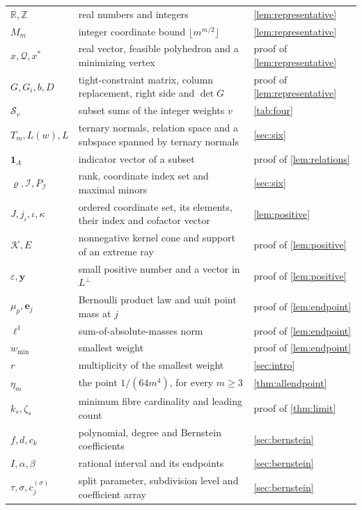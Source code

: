 \documentclass[11pt,a4paper]{article}
\numberwithin{equation}{section}
\theoremstyle{remark}
\newcommand{\eps}{\varepsilon}
\newcommand{\R}{\mathbb R}
\newcommand{\Z}{\mathbb Z}
\begin{document}
\begin{longtable}{p{}p{}p{}}
$\R,\Z$ & real numbers and integers & \cref{lem:representative}\\
$M_m$ & integer coordinate bound $\lfloor m^{m/2}\rfloor$ & \cref{lem:representative}\\
$x,\mathcal Q,x^*$ & real vector, feasible polyhedron and a minimizing vertex & proof of \cref{lem:representative}\\
$G,G_i,b,D$ & tight-constraint matrix, column replacement, right side and $\det G$ & proof of \cref{lem:representative}\\
$\mathcal S_v$ & subset sums of the integer weights $v$ & \cref{tab:four}\\
$T_m,L(w),L$ & ternary normals, relation space and a subspace spanned by ternary normals & \cref{sec:six}\\
$\mathbf 1_A$ & indicator vector of a subset & proof of \cref{lem:relations}\\
$\varrho,\mathcal I,P_{\mathcal I}$ & rank, coordinate index set and maximal minors & \cref{sec:six}\\
$J,j_\iota,\iota,\kappa$ & ordered coordinate set, its elements, their index and cofactor vector & \cref{lem:positive}\\
$\mathcal K,E$ & nonnegative kernel cone and support of an extreme ray & proof of \cref{lem:positive}\\
$\eps,\mathbf y$ & small positive number and a vector in $L^\perp$ & proof of \cref{lem:positive}\\
$\mu_p,\mathbf e_j$ & Bernoulli product law and unit point mass at $j$ & proof of \cref{lem:endpoint}\\
$\ell^1$ & sum-of-absolute-masses norm & proof of \cref{lem:endpoint}\\
$w_{\min}$ & smallest weight & proof of \cref{lem:endpoint}\\
$r$ & multiplicity of the smallest weight & \cref{sec:intro}\\
$\eta_m$ & the point $1/(64m^4)$, for every $m\ge3$ & \cref{thm:allendpoint}\\
$k_s,\zeta_s$ & minimum fibre cardinality and leading count & proof of \cref{thm:limit}\\
$f,d,c_k$ & polynomial, degree and Bernstein coefficients & \cref{sec:bernstein}\\
$I,\alpha,\beta$ & rational interval and its endpoints & \cref{sec:bernstein}\\
$\tau,\sigma,c_j^{(\sigma)}$ & split parameter, subdivision level and coefficient array & \cref{sec:bernstein}\\

\end{longtable}
\end{document}
